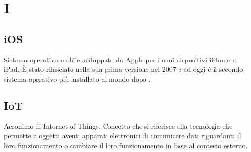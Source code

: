 \section*{I}
\markright{}

\subsection*{iOS}
Sistema operativo mobile sviluppato da Apple per i suoi dispositivi iPhone e iPad. È stato rilasciato nella sua prima versione nel 2007 e ad oggi è il secondo sistema operativo più installato al mondo dopo .

\subsection*{IoT}
Acronimo di Internet of Things. Concetto che si riferisce alla tecnologia che permette a oggetti aventi apparati elettronici di comunicare dati riguardanti il loro funzionamento o cambiare il loro funzionamento in base al contesto esterno. 